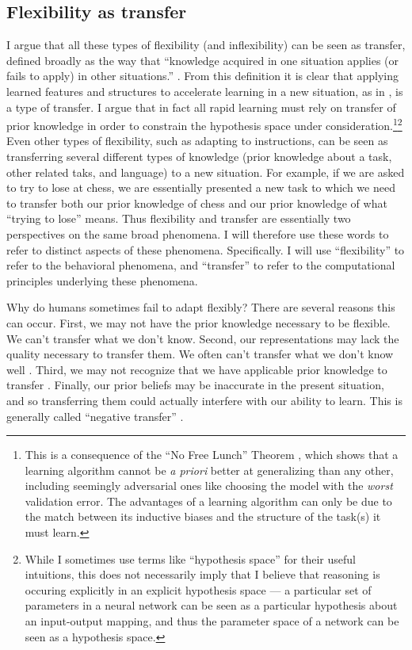 \subsection{Flexibility as transfer}
I argue that all these types of flexibility (and inflexibility) can be seen as transfer, defined broadly as the way that ``knowledge acquired in one situation applies (or fails to apply) in other situations.'' \citep{Singley1989}. From this definition it is clear that applying learned features and structures to accelerate learning in a new situation, as in \citet{Bourne1970}, is a type of transfer. I argue that in fact all rapid learning must rely on transfer of prior knowledge in order to constrain the hypothesis space under consideration.\footnote{This is a consequence of the ``No Free Lunch'' Theorem \citep{Wolpert1996}, which shows that a learning algorithm cannot be \emph{a priori} better at generalizing than any other, including seemingly adversarial ones like choosing the model with the \emph{worst} validation error. The advantages of a learning algorithm can only be due to the match between its inductive biases and the structure of the task(s) it must learn.}\footnote{While I sometimes use terms like ``hypothesis space'' for their useful intuitions, this does not necessarily imply that I believe that reasoning is occuring explicitly in an explicit hypothesis space --- a particular set of parameters in a neural network can be seen as a particular hypothesis about an input-output mapping, and thus the parameter space of a network can be seen as a hypothesis space.} Even other types of flexibility, such as adapting to instructions, can be seen as transferring several different types of knowledge (prior knowledge about a task, other related taks, and language) to a new situation. For example, if we are asked to try to lose at chess, we are essentially presented a new task to which we need to transfer both our prior knowledge of chess and our prior knowledge of what ``trying to lose'' means. Thus flexibility and transfer are essentially two perspectives on the same broad phenomena. I will therefore use these words to refer to distinct aspects of these phenomena. Specifically. I will use ``flexibility'' to refer to the behavioral phenomena, and ``transfer'' to refer to the computational principles underlying these phenomena. \par  
Why do humans sometimes fail to adapt flexibly? There are several reasons this can occur. First, we may not have the prior knowledge necessary to be flexible. We can't transfer what we don't know. Second, our representations may lack the quality necessary to transfer them. We often can't transfer what we don't know well \citep[c.f.][]{Karmiloff-Smith1992, Hazzan1999, Weber2001}. Third, we may not recognize that we have applicable prior knowledge to transfer \citep{Detterman1993}. Finally, our prior beliefs may be inaccurate in the present situation, and so transferring them could actually interfere with our ability to learn. This is generally called ``negative transfer'' \citep{Singley1989}. \par
